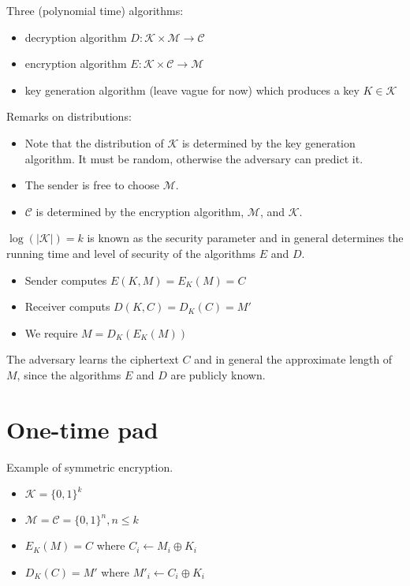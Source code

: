 \documentclass[12pt]{article}
\begin{document}
Three (polynomial time) algorithms:

\begin{itemize}
\item decryption algorithm $D : \mathcal{K} \times \mathcal{M} \rightarrow \mathcal{C}$
\item encryption algorithm $E : \mathcal{K} \times \mathcal{C} \rightarrow \mathcal{M}$
\item key generation algorithm (leave vague for now) which produces a key $K \in \mathcal{K}$
\end{itemize}

Remarks on distributions:

\begin{itemize}
\item
Note that the distribution of $\mathcal{K}$ is determined by the key
generation algorithm. It must be random, otherwise the adversary can
predict it.

\item
The sender is free to choose $\mathcal{M}$.

\item
$\mathcal{C}$ is determined by the encryption
algorithm, $\mathcal{M}$, and $\mathcal{K}$.
\end{itemize}

$\log{(|\mathcal{K}|)} = k$ is known as the security parameter and
in general determines the running time and level of security of the
algorithms $E$ and $D$.

\begin{itemize}
\item Sender computes $E(K,M) = E_K(M) = C$
\item Receiver computs $D(K,C) = D_K(C) = M'$
\item We require $M = D_K(E_K(M))$
\end{itemize}

The adversary learns the ciphertext $C$ and in general the approximate
length of $M$, since the algorithms $E$ and $D$ are publicly known.

\section{One-time pad}

Example of symmetric encryption.

\begin{itemize}
\item $\mathcal{K} = \{0,1\}^k$
\item $\mathcal{M} = \mathcal{C} = \{0,1\}^n, n \le k$
\item $E_K(M) = C$ where $C_i \gets M_i \oplus K_i$
\item $D_K(C) = M'$ where $M'_i \gets C_i \oplus K_i$
\end{itemize}
\end{document}
